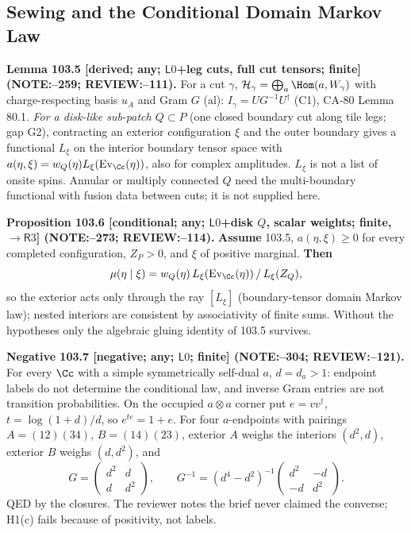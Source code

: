 \subsection{Sewing and the Conditional Domain Markov Law}

\textbf{Lemma 103.5 [derived; any; \(\mathsf L0\)+leg cuts, full cut tensors; finite] (NOTE:--259; REVIEW:--111).}
For a cut \(\gamma\), \(\mathcal H_\gamma=\bigoplus_a\Hom(a,W_\gamma)\) with charge-respecting basis \(u_A\) and Gram \(G\) (al):
\(I_\gamma=UG^{-1}U^\dagger\) (C1), CA-80 Lemma 80.1. \emph{For a disk-like sub-patch \(Q\subset P\)} (one closed boundary cut along tile
legs; gap G2), contracting an exterior configuration \(\xi\) and the outer boundary gives a functional \(L_\xi\) on the interior boundary
tensor space with \(a(\eta,\xi)=w_Q(\eta)L_\xi(\operatorname{Ev}_\Cc(\eta))\), also for complex amplitudes. \(L_\xi\) is not a list of onsite spins.
Annular or multiply connected \(Q\) need the multi-boundary functional with fusion data between cuts; it is not supplied here.

\textbf{Proposition 103.6 [conditional; any; \(\mathsf L0\)+disk \(Q\), scalar weights; finite, \(\to\mathsf R3\)] (NOTE:--273; REVIEW:--114).}
\textbf{Assume} 103.5, \(a(\eta,\xi)\ge0\) for every completed configuration, \(Z_P>0\), and \(\xi\) of positive marginal. \textbf{Then}
\[ \mu(\eta\mid\xi)=w_Q(\eta)\,L_\xi(\operatorname{Ev}_\Cc(\eta))\,/\,L_\xi(Z_Q), \]
so the exterior acts only through the ray \([L_\xi]\) (boundary-tensor domain Markov law); nested interiors are consistent by
associativity of finite sums. Without the hypotheses only the algebraic gluing identity of 103.5 survives.

\textbf{Negative 103.7 [negative; any; \(\mathsf L0\); finite] (NOTE:--304; REVIEW:--121).}
For every \(\Cc\) with a simple symmetrically self-dual \(a\), \(d=d_a>1\): endpoint labels do not determine the conditional law, and
inverse Gram entries are not transition probabilities. On the occupied \(a\otimes a\) corner put \(e=vv^\dagger\), \(t=\log(1+d)/d\), so
\(e^{te}=1+e\). For four \(a\)-endpoints with pairings \(A=(12)(34)\), \(B=(14)(23)\), exterior \(A\) weighs the interiors \((d^2,d)\), exterior \(B\)
weighs \((d,d^2)\), and
\[ G=\begin{pmatrix}d^2&d\\d&d^2\end{pmatrix},\qquad G^{-1}=(d^4-d^2)^{-1}\begin{pmatrix}d^2&-d\\-d&d^2\end{pmatrix}. \]
QED by the closures. The reviewer notes the brief never claimed the converse; H1(c) fails because of positivity, not labels.

